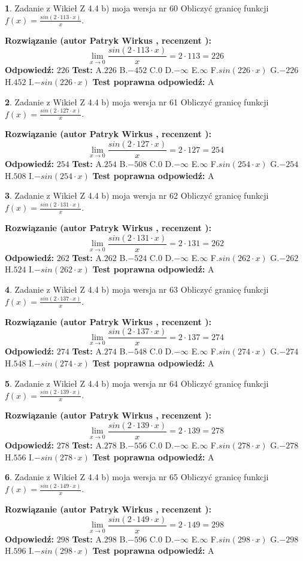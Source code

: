 \documentclass[12pt, a4paper]{article}
\theoremstyle{definition} %
\newtheorem{zad}{}
\newcommand{\zadStart}[1]{\begin{zad}#1\newline}
\newcommand{\zadStop}{\end{zad}}
\newcommand{\rozwStart}[2]{\noindent \textbf{Rozwiązanie (autor #1 , recenzent #2): }\newline}
\newcommand{\rozwStop}{\newline}
\newcommand{\odpStart}{\noindent \textbf{Odpowiedź:}\newline}
\newcommand{\odpStop}{\newline}
\newcommand{\testStart}{\noindent \textbf{Test:}\newline}
\newcommand{\testStop}{\newline}
\newcommand{\kluczStart}{\noindent \textbf{Test poprawna odpowiedź:}\newline}
\newcommand{\kluczStop}{\newline}
\begin{document}
\zadStart{Zadanie z Wikieł Z 4.4 b) moja wersja nr 60}
Obliczyć granicę funkcji $f(x)=\frac{sin(2 \cdot113\cdot x)}{x}$.
\zadStop
\rozwStart{Patryk Wirkus}{}
$$\lim\limits_{x\to 0}\frac{sin(2 \cdot 113\cdot x)}{x}=
2 \cdot 113 = 226$$
\rozwStop
\odpStart
$226$
\odpStop
\testStart
A.$226$
B.$-452$
C.$0$
D.$-\infty$
E.$\infty$
F.$sin(226\cdot x)$
G.$-226$
H.$452$
I.$-sin(226\cdot x)$
\testStop
\kluczStart
A
\kluczStop



\zadStart{Zadanie z Wikieł Z 4.4 b) moja wersja nr 61}
Obliczyć granicę funkcji $f(x)=\frac{sin(2 \cdot127\cdot x)}{x}$.
\zadStop
\rozwStart{Patryk Wirkus}{}
$$\lim\limits_{x\to 0}\frac{sin(2 \cdot 127\cdot x)}{x}=
2 \cdot 127 = 254$$
\rozwStop
\odpStart
$254$
\odpStop
\testStart
A.$254$
B.$-508$
C.$0$
D.$-\infty$
E.$\infty$
F.$sin(254\cdot x)$
G.$-254$
H.$508$
I.$-sin(254\cdot x)$
\testStop
\kluczStart
A
\kluczStop



\zadStart{Zadanie z Wikieł Z 4.4 b) moja wersja nr 62}
Obliczyć granicę funkcji $f(x)=\frac{sin(2 \cdot131\cdot x)}{x}$.
\zadStop
\rozwStart{Patryk Wirkus}{}
$$\lim\limits_{x\to 0}\frac{sin(2 \cdot 131\cdot x)}{x}=
2 \cdot 131 = 262$$
\rozwStop
\odpStart
$262$
\odpStop
\testStart
A.$262$
B.$-524$
C.$0$
D.$-\infty$
E.$\infty$
F.$sin(262\cdot x)$
G.$-262$
H.$524$
I.$-sin(262\cdot x)$
\testStop
\kluczStart
A
\kluczStop



\zadStart{Zadanie z Wikieł Z 4.4 b) moja wersja nr 63}
Obliczyć granicę funkcji $f(x)=\frac{sin(2 \cdot137\cdot x)}{x}$.
\zadStop
\rozwStart{Patryk Wirkus}{}
$$\lim\limits_{x\to 0}\frac{sin(2 \cdot 137\cdot x)}{x}=
2 \cdot 137 = 274$$
\rozwStop
\odpStart
$274$
\odpStop
\testStart
A.$274$
B.$-548$
C.$0$
D.$-\infty$
E.$\infty$
F.$sin(274\cdot x)$
G.$-274$
H.$548$
I.$-sin(274\cdot x)$
\testStop
\kluczStart
A
\kluczStop



\zadStart{Zadanie z Wikieł Z 4.4 b) moja wersja nr 64}
Obliczyć granicę funkcji $f(x)=\frac{sin(2 \cdot139\cdot x)}{x}$.
\zadStop
\rozwStart{Patryk Wirkus}{}
$$\lim\limits_{x\to 0}\frac{sin(2 \cdot 139\cdot x)}{x}=
2 \cdot 139 = 278$$
\rozwStop
\odpStart
$278$
\odpStop
\testStart
A.$278$
B.$-556$
C.$0$
D.$-\infty$
E.$\infty$
F.$sin(278\cdot x)$
G.$-278$
H.$556$
I.$-sin(278\cdot x)$
\testStop
\kluczStart
A
\kluczStop



\zadStart{Zadanie z Wikieł Z 4.4 b) moja wersja nr 65}
Obliczyć granicę funkcji $f(x)=\frac{sin(2 \cdot149\cdot x)}{x}$.
\zadStop
\rozwStart{Patryk Wirkus}{}
$$\lim\limits_{x\to 0}\frac{sin(2 \cdot 149\cdot x)}{x}=
2 \cdot 149 = 298$$
\rozwStop
\odpStart
$298$
\odpStop
\testStart
A.$298$
B.$-596$
C.$0$
D.$-\infty$
E.$\infty$
F.$sin(298\cdot x)$
G.$-298$
H.$596$
I.$-sin(298\cdot x)$
\testStop
\kluczStart
A
\kluczStop
\end{document}

